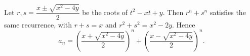 Let $r,s=\dfrac{x\pm\sqrt{x^2-4y}}2$ be the roots of $t^2-xt+y$. Then $r^n+s^n$ satisfies the same recurrence, with $r+s=x$ and $r^2+s^2=x^2-2y$. Hence
\[a_n=\boxed{\left(\dfrac{x+\sqrt{x^2-4y}}2\right)^n+\left(\dfrac{x-\sqrt{x^2-4y}}2\right)^n}.\]
